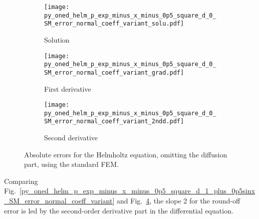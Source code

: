 \documentclass[review,3p]{elsarticle}
\begin{document}
\begin{figure}[!ht]
    \begin{subfigure}{5.5cm}
        \texttt{[image: py\_oned\_helm\_p\_exp\_minus\_x\_minus\_0p5\_square\_d\_0\_SM\_error\_normal\_coeff\_variant\_solu.pdf]}
        \caption{Solution}
        \label{py_oned_helm_p_exp_minus_x_minus_0p5_square_d_0_SM_error_normal_coeff_variant_solu}
    \end{subfigure}
    \hspace{-0.2cm}
    \begin{subfigure}{5.5cm}
        \texttt{[image: py\_oned\_helm\_p\_exp\_minus\_x\_minus\_0p5\_square\_d\_0\_SM\_error\_normal\_coeff\_variant\_grad.pdf]}
        \caption{First derivative}
        \label{py_oned_helm_p_exp_minus_x_minus_0p5_square_d_0_SM_error_normal_coeff_variant_grad}
    \end{subfigure}
    \hspace{-0.2cm}
    \begin{subfigure}{5.5cm}
        \texttt{[image: py\_oned\_helm\_p\_exp\_minus\_x\_minus\_0p5\_square\_d\_0\_SM\_error\_normal\_coeff\_variant\_2ndd.pdf]}
        \caption{Second derivative}
        \label{py_oned_helm_p_exp_minus_x_minus_0p5_square_d_0_SM_error_normal_coeff_variant_2ndd}
    \end{subfigure}
\caption{Absolute errors for the Helmholtz equation, omitting the diffusion part, using the standard FEM.}
\label{py_oned_helm_p_exp_minus_x_minus_0p5_square_d_0_SM_error_normal_coeff_variant}
\end{figure}


Comparing Fig.~\ref{py_oned_helm_p_exp_minus_x_minus_0p5_square_d_1_plus_0p5sinx_SM_error_normal_coeff_variant} and Fig.~\ref{py_oned_helm_p_exp_minus_x_minus_0p5_square_d_0_SM_error_normal_coeff_variant}, the slope 2 for the round-off error is led by the second-order derivative part in the differential equation.
\end{document}
